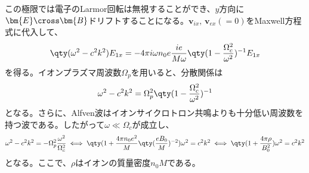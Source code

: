 この極限では電子のLarmor回転は無視することができ、$y$方向に$\bm{E}\cross\bm{B}$ドリフトすることになる。$\bm{v}_{ix},\,\bm{v}_{ex}(=0)$をMaxwell方程式に代入して、
\begin{equation}
	\qty(\omega^2 - c^2k^2)E_{1x} = -4\pi{}i\omega{}n_0e\frac{ie}{M\omega}\qty(1-\frac{\Omega^2_c}{\omega^2})^{-1}E_{1x}
\end{equation}
を得る。イオンプラズマ周波数$\Omega_{p}$を用いると、分散関係は
\begin{equation}
	\omega^2 - c^2k^2 = \Omega^2_{p}\qty(1-\frac{\Omega^2_c}{\omega^2})^{-1}
\end{equation}
となる。さらに、Alfven波はイオンサイクロトロン共鳴よりも十分低い周波数を持つ波である。したがって$\omega \ll \Omega_c$が成立し、
\begin{equation}
	\omega^2 - c^2k^2 = -\Omega^2_{p}\frac{\omega^2}{\Omega_c^2}\iff \qty(1+\frac{4\pi{}n_0e^2}{M}\qty(\frac{eB_0}{M})^{-2})\omega^2 = c^2k^2
	\iff \qty(1+\frac{4\pi\rho}{B_0^2})\omega^2 = c^2k^2
\end{equation}
となる。ここで、$\rho$はイオンの質量密度$n_0M$である。

